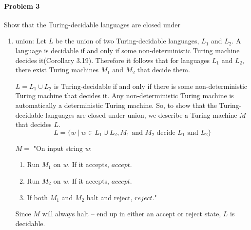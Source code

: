 \documentclass{article}
\begin{document}
\paragraph{Problem 3}
Show that the Turing-decidable languages are closed under
\begin{enumerate}[\indent a)]
    \item union: Let $L$ be the union of two Turing-decidable languages, $L_1$ and $L_2$. A language is decidable if and only if some non-deterministic Turing machine decides it(Corollary 3.19). Therefore it follows that for languages $L_1$ and $L_2$, there exist Turing machines $M_1$ and $M_2$ that decide them.

$L = L_1 \cup L_2$ is Turing-decidable if and only if there is some non-deterministic Turing machine that decides it. Any non-deterministic Turing machine is automatically a deterministic Turing machine. So, to show that the Turing-decidable languages are closed under union, we describe a Turing machine $M$ that decides $L$.
$$L = \{w \;|\;  w \in L_1\cup L_2, M_1 \text{ and  $M_2$ decide $L_1$ and $L_2$}\}$$

$M = $ "On input string $w$: 
    \begin{enumerate}[\indent 1.]
    \item Run $M_1$ on $w$. If it accepts, $accept$.
    \item Run $M_2$ on $w$. If it accepts, $accept$.
    \item If both $M_1$ and $M_2$ halt and reject, $reject$."
    \end{enumerate}
    
    
    Since $M$ will always halt -- end up in either an accept or reject state, $L$ is decidable.
    

\end{enumerate}
\end{document}
